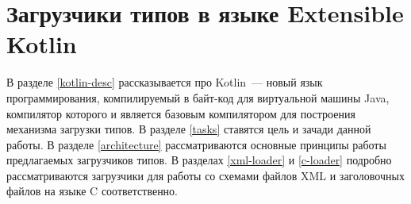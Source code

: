 \clearpage
\section{Загрузчики типов в языке Extensible Kotlin}
В разделе \ref{kotlin-desc} рассказывается про Kotlin~--- новый язык программирования, компилируемый в байт-код для виртуальной машины Java, компилятор которого и является базовым компилятором для построения механизма загрузки типов.
В разделе \ref{tasks} ставятся цель и зачади данной работы.
В разделе \ref{architecture} рассматриваются основные принципы работы предлагаемых загрузчиков типов.
В разделах \ref{xml-loader} и \ref{c-loader} подробно рассматриваются загрузчики для работы со схемами файлов XML и заголовочных файлов на языке C соответственно.





